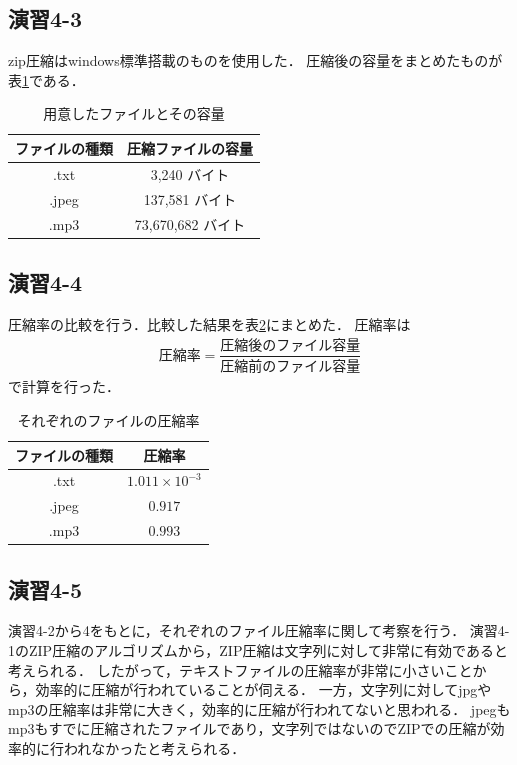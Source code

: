 \documentclass[documentclass]{jsarticle}
\begin{document}
\subsection*{演習4-3}
zip圧縮はwindows標準搭載のものを使用した．
圧縮後の容量をまとめたものが表\ref*{tb:4-2}である．
\begin{table}[h]
  \begin{center}
    \caption{用意したファイルとその容量}
    \label{tb:4-2}
    \begin{tabular}{|cc|} \hline
     ファイルの種類 & 圧縮ファイルの容量 \\ \hline
     .txt    & 3,240 バイト \\
     .jpeg   & 137,581  バイト \\
     .mp3    & 73,670,682  バイト \\ \hline
    \end{tabular}
  \end{center}
\end{table}

\subsection*{演習4-4}
圧縮率の比較を行う．比較した結果を表\ref*{tb:4-3}にまとめた．
圧縮率は
\begin{align*}
  圧縮率 = \dfrac{圧縮後のファイル容量}{圧縮前のファイル容量}
\end{align*}
で計算を行った．
\begin{table}[h]
  \begin{center}
    \caption{それぞれのファイルの圧縮率}
    \label{tb:4-3}
    \begin{tabular}{|cc|} \hline
     ファイルの種類 & 圧縮率 \\ \hline
     .txt    &  $1.011 \times 10^{-3}$\\
     .jpeg   & $0.917$ \\
     .mp3    & $0.993$ \\ \hline
    \end{tabular}
  \end{center}
\end{table}

\subsection*{演習4-5}
演習4-2から4をもとに，それぞれのファイル圧縮率に関して考察を行う．
演習4-1のZIP圧縮のアルゴリズムから，ZIP圧縮は文字列に対して非常に有効であると考えられる．
したがって，テキストファイルの圧縮率が非常に小さいことから，効率的に圧縮が行われていることが伺える．
一方，文字列に対してjpgやmp3の圧縮率は非常に大きく，効率的に圧縮が行われてないと思われる．
jpegもmp3もすでに圧縮されたファイルであり，文字列ではないのでZIPでの圧縮が効率的に行われなかったと考えられる．
\end{document}
